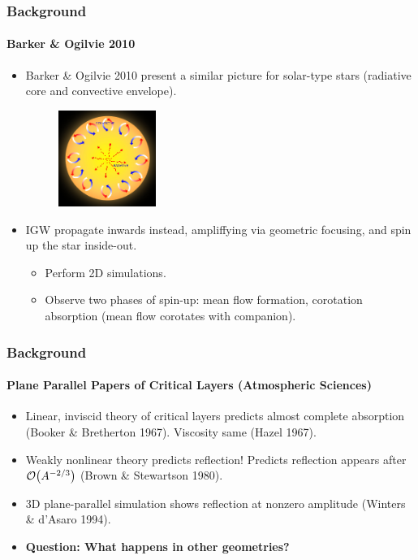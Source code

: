 \documentclass[dvipsnames]{beamer}
\DeclarePairedDelimiter\p{\lparen}{\rparen}
\begin{document}
\begin{frame}
    \frametitle{Background}
    \framesubtitle{Barker \& Ogilvie 2010}

    \begin{itemize}
        \item Barker \& Ogilvie 2010 present a similar picture for solar-type
            stars (radiative core and convective envelope).
            \begin{figure}[h]
                \centering
                \includegraphics[width=0.3\textwidth]{rad_core.jpg}
            \end{figure}

        \item IGW propagate inwards instead, ampliffying via geometric focusing,
            and spin up the star inside-out.

        \begin{itemize}
            \item Perform 2D simulations.
            \item Observe two phases of spin-up: mean flow formation, corotation
                absorption (mean flow corotates with companion).
        \end{itemize}
    \end{itemize}
\end{frame}

\begin{frame}
    \frametitle{Background}
    \framesubtitle{Plane Parallel Papers of Critical Layers
        (Atmospheric Sciences)}
    \begin{itemize}
        \item Linear, inviscid theory of critical layers predicts almost
            complete absorption (Booker \& Bretherton 1967). Viscosity same
            (Hazel 1967).

        \item Weakly nonlinear theory predicts reflection! Predicts reflection
            appears after $\mathcal{O}\p*{A^{-2/3}}$ (Brown \& Stewartson 1980).

        \item 3D plane-parallel simulation shows reflection at nonzero amplitude
            (Winters \& d'Asaro 1994).

        \item \textbf{Question: What happens in other geometries?}
    \end{itemize}
\end{frame}
\end{document}
